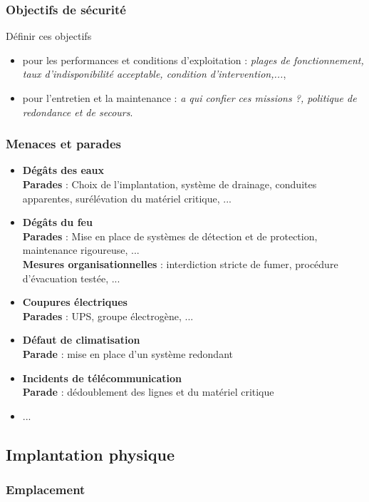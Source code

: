 \documentclass[10pt,a4paper,oneside,titlepage]{report}
\newcommand{\titre}[1]{\textcolor{title}{#1}}
\newcommand{\strong}[1]{\textbf{\titre{#1}}}
\begin{document}
\subsubsection{Objectifs de sécurité}

Définir ces objectifs
\begin{itemize}
\item pour les performances et conditions d'exploitation : \textit{plages de fonctionnement, taux d'indisponibilité acceptable, condition d'intervention,...},
\item pour l'entretien et la maintenance : \textit{a qui confier ces missions ?, politique de redondance et de secours}.
\end{itemize}

\subsubsection{Menaces et parades}

\begin{itemize}
\item \strong{Dégâts des eaux}\\
\textbf{Parades} : Choix de l'implantation, système de drainage, conduites apparentes, surélévation du matériel critique, ...
\item \strong{Dégâts du feu}\\
\textbf{Parades} : Mise en place de systèmes de détection et de protection, maintenance rigoureuse, ...\\
\textbf{Mesures organisationnelles} : interdiction stricte de fumer, procédure d'évacuation testée, ...
\item \strong{Coupures électriques}\\
\textbf{Parades} : UPS, groupe électrogène, ...
\item \strong{Défaut de climatisation}\\
\textbf{Parade} : mise en place d'un système redondant
\item \strong{Incidents de télécommunication}\\
\textbf{Parade} : dédoublement des lignes et du matériel critique
\item ...
\end{itemize}

\subsection{Implantation physique}

\subsubsection{Emplacement}
\end{document}
